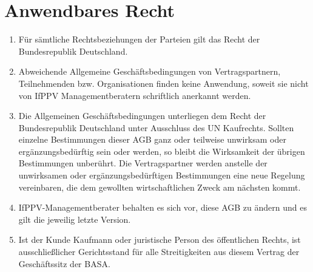 \documentclass[a4paper, 12pt]{scrartcl}
\begin{document}
    \section{Anwendbares Recht}
    \begin{enumerate}
        \item F\"ur s\"amtliche Rechtsbeziehungen der Parteien gilt das Recht der Bundesrepublik Deutschland.

        \item Abweichende Allgemeine Gesch\"aftsbedingungen von Vertragspartnern, Teilnehmenden bzw. Organisationen finden keine Anwendung, soweit sie nicht von IfPPV Managementberatern schriftlich anerkannt werden.

        \item Die Allgemeinen Gesch\"aftsbedingungen unterliegen dem Recht der Bundesrepublik Deutschland unter Ausschluss des UN Kaufrechts.
        Sollten einzelne Bestimmungen dieser AGB ganz oder teilweise unwirksam oder erg\"anzungsbed\"urftig sein oder werden, so bleibt die Wirksamkeit der \"ubrigen Bestimmungen unber\"uhrt.
        Die Vertragspartner werden anstelle der unwirksamen oder erg\"anzungsbed\"urftigen Bestimmungen eine neue Regelung vereinbaren, die dem gewollten wirtschaftlichen Zweck am n\"achsten kommt.

        \item IfPPV-Managementberater behalten es sich vor, diese AGB zu \"andern und es gilt die jeweilig letzte Version.

        \item Ist der Kunde Kaufmann oder juristische Person des \"offentlichen Rechts, ist ausschließlicher Gerichtsstand f\"ur alle Streitigkeiten aus diesem Vertrag der Gesch\"aftssitz der BASA.
    \end{enumerate}

    \newpage
    

    \newpage
    
\end{document}

